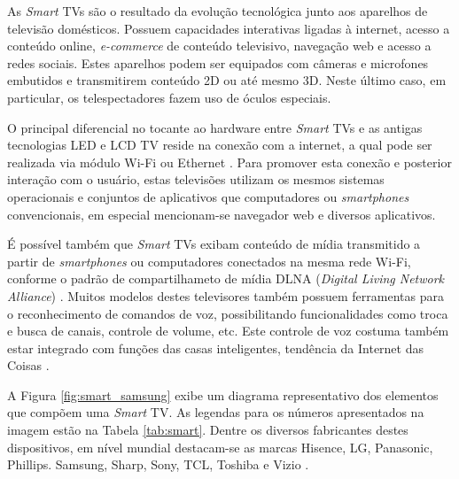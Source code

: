 
As \emph{Smart} TVs são o resultado da evolução tecnológica junto aos aparelhos de televisão domésticos. Possuem capacidades interativas ligadas à internet, acesso a conteúdo online, \emph{e-commerce} de conteúdo televisivo, navegação web e acesso a redes sociais. Estes aparelhos podem ser equipados com câmeras e microfones embutidos e transmitirem conteúdo 2D ou até mesmo 3D. Neste último caso, em particular, os telespectadores fazem uso de óculos especiais.

O principal diferencial no tocante ao hardware entre \emph{Smart} TVs e as antigas tecnologias LED e LCD TV reside na conexão com a internet, a qual pode ser realizada via módulo Wi-Fi ou Ethernet \cite{differencebetween,tomsguid:everythingsmart}. Para promover esta conexão e posterior interação com o usuário, estas televisões utilizam os mesmos sistemas operacionais e conjuntos de aplicativos que computadores ou \emph{smartphones} convencionais, em especial mencionam-se navegador web e diversos aplicativos.

É possível também que \emph{Smart} TVs exibam conteúdo de mídia transmitido a partir de \emph{smartphones} ou computadores conectados na mesma rede Wi-Fi, conforme o padrão de compartilhameto de mídia DLNA (\emph{Digital Living Network Alliance}) \cite{michele2014watch,shin2013smart,perakakis2015proposed,whatisasmarttv}. Muitos modelos destes televisores também possuem ferramentas para o reconhecimento de comandos de voz, possibilitando funcionalidades como troca e busca de canais, controle de volume, etc. Este controle de voz costuma também estar integrado com funções das casas inteligentes, tendência da Internet das Coisas \cite{tomsguid:everythingsmart}.

A Figura \ref{fig:smart_samsung} exibe um diagrama representativo dos elementos que compõem uma \emph{Smart} TV. As legendas para os números apresentados na imagem estão na Tabela \ref{tab:smart}. Dentre os diversos fabricantes destes dispositivos,  em nível mundial destacam-se as marcas Hisence, LG, Panasonic, Phillips. Samsung, Sharp, Sony, TCL, Toshiba e Vizio \cite{tomsguid:everythingsmart}. 

